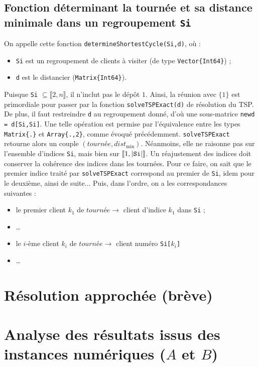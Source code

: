 \documentclass[french, 11pt, a4paper]{article} %
\newcommand{\smb}{\smallbreak}
\begin{document}
\subsection{Fonction déterminant la tournée et sa distance minimale dans un regroupement \texttt{Si}}
On appelle cette fonction \texttt{determineShortestCycle(Si,d)}, où : 
\begin{itemize}
    \item \verb+Si+ est un regroupement de clients à visiter (de type \verb+Vector{Int64}+) ;
    \item \verb+d+ est le distancier (\verb+Matrix{Int64}+).
\end{itemize}
\smb Puisque \verb+Si+ $\subseteq \llbracket 2,n \rrbracket$, il n'inclut pas le dépôt $1$. Ainsi, la réunion avec $\{1\}$
est primordiale pour passer par la fonction \verb+solveTSPExact(d)+ de résolution du TSP.
\smb De plus, il faut restreindre \verb+d+ au regroupement donné, d'où une sous-matrice
\verb+newd = d[Si,Si]+. Une telle opération est permise par l'équivalence entre les types
\verb+Matrix{.}+ et \verb+Array{.,2}+, comme évoqué précédemment.
\smb \verb+solveTSPExact+ retourne alors un couple $(tourn\text{é}e,dist_{\text{min}})$. Néanmoins, elle ne raisonne pas sur l'ensemble d'indices \verb+Si+, mais bien sur
$\llbracket 1,|\text{\texttt{Si}}| \rrbracket$. 
\smb Un réajustement des indices doit conserver la cohérence
des indices dans les tournées. Pour ce faire, on sait que le premier indice traité par \verb+solveTSPExact+ correspond au premier de \verb+Si+,
idem pour le deuxième, ainsi de suite... Puis, dans l'ordre, on a les correspondances suivantes :
\begin{itemize}
    \item le premier client $k_1$ de $tourn\text{é}e \longrightarrow$ client d'indice $k_1$ dans \verb+Si+ ;
    \item \dots
    \item le $i$-ème client $k_i$ de $tourn\text{é}e \longrightarrow$ client numéro \verb+Si[+$k_i$\verb+]+
    \item \dots
\end{itemize}


\section{Résolution approchée (brève)}

\section{Analyse des résultats issus des instances numériques ($A$ et $B$)}
\end{document}
